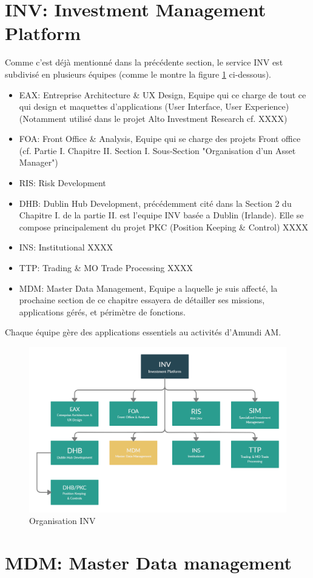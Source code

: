 \section{INV: Investment Management Platform}
\par Comme c'est déjà mentionné dans la précédente section, le service INV est subdivisé en plusieurs équipes (comme le montre la figure \ref{fig:inv} ci-dessous).\\
\begin{itemize}
    \item EAX: Entreprise Architecture \& UX Design, Equipe qui ce charge de tout ce qui design et maquettes d'applications (User Interface, User Experience) (Notamment utilisé dans le projet Alto Investment Research cf. XXXX) 
    \item FOA: Front Office \& Analysis, Equipe qui se charge des projets Front office (cf. Partie I. Chapitre II. Section I. Sous-Section "Organisation d'un Asset Manager")
    \item RIS: Risk Development
    \item DHB: Dublin Hub Development, précédemment cité dans la Section 2 du Chapitre I. de la partie II. est l'equipe INV basée a Dublin (Irlande). Elle se compose principalement du projet PKC (Position Keeping \& Control) XXXX
    \item INS: Institutional XXXX
    \item TTP: Trading \& MO Trade Processing XXXX
    \item MDM: Master Data Management, Equipe a laquelle je suis affecté, la prochaine section de ce chapitre essayera de détailler ses missions, applications gérés, et périmètre de fonctions.
\end{itemize}
\par Chaque équipe gère des applications essentiels au activités d'Amundi AM.
\begin{figure}[ht]
    \includegraphics[width=\columnwidth]{img/Org INV.png}
    \caption{Organisation INV}
    \label{fig:inv}
\end{figure}

\section{MDM: Master Data management}


